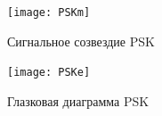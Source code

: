 \documentclass[10pt,a4paper]{article}
\begin{document}
\begin{figure}[h]\centering
	\texttt{[image: PSKm]}
	\caption{Сигнальное созвездие PSK}\label{fig.PSKm}
\end{figure}                                                                                                                                                                                                                                                                                                                                                                                                                                                                                                                                                                                                                                                                                                                                                                                                                                                                                                                                                                                                                                                                                                                                                                                                                                                                                                                                                                                                                                                                        
\begin{figure}[h]\centering
	\texttt{[image: PSKe]}
	\caption{Глазковая диаграмма PSK}\label{fig.PSKe}
\end{figure}                                                                                                                                                                                                                                                                                                                                                                                                                                                                                                                                                                                                                                                                                                                                                                                                                                                                                                                                                                                                                                                                                                                                                                                                                                                                                                                                                                                                                                                                        
\end{document}
